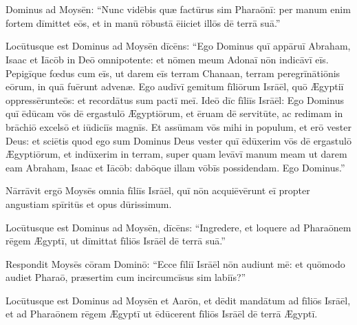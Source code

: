 \chapter{}
\thispagestyle{empty}

 Dominus ad Moysēn: ``Nunc vidēbis quæ factūrus
sim Pharaōnī: per manum enim fortem dīmittet eōs, et in
manū rōbustā ēiiciet illōs dē
terrā suā.''

Locūtusque est
Dominus ad Moysēn dīcēns: ``Ego Dominus quī appāruī
Abraham, Isaac et Iācōb in Deō omnipotente:
et nōmen meum Adonaī
nōn indicāvī eīs. 
Pepigīque fœdus cum eīs, ut darem eīs terram
Chanaan, terram peregrīnātiōnis eōrum, in
quā fuērunt advenæ.  Ego audīvī gemitum fīliōrum Isrāēl, quō Ægyptiī
oppressērunt\linebreak eōs:
et recordātus sum pactī meī.  Ideō dīc
fīliīs Isrāēl: Ego Dominus quī ēdūcam vōs dē
ergastulō Ægyptiōrum, et ēruam dē servitūte, ac redimam in
brāchiō excelsō et
iūdiciīs
magnīs.  Et assūmam vōs mihi in populum, et erō vester Deus: et sciētis
quod ego sum Dominus Deus vester quī ēdūxerim vōs dē
ergastulō Ægyptiōrum,  et indūxerim in terram, super quam
levāvī manum meam ut darem eam Abraham, Isaac et Iācōb:
dabōque illam vōbīs possidendam. Ego Dominus.''

Nārrāvit ergō
Moysēs omnia fīliīs Isrāēl, quī nōn
acquiēvērunt eī propter angustiam
spīritūs et opus dūrissimum.  

Locūtusque est Dominus ad
Moysēn, dīcēns:  ``Ingredere, et
loquere ad Pharaōnem rēgem Ægyptī, ut dīmittat fīliōs
Isrāēl dē terrā suā.''

Respondit Moysēs
cōram Dominō: ``Ecce fīliī Isrāēl nōn audiunt mē: et
quōmodo audiet Pharaō, præsertim cum incircumcīsus sim labiīs?''

Locūtusque est Dominus ad
Moysēn et Aarōn, et dēdit mandātum ad
fīliōs Isrāēl, et ad Pharaōnem rēgem Ægyptī
ut ēdūcerent fīliōs Isrāēl dē terrā Ægyptī.
